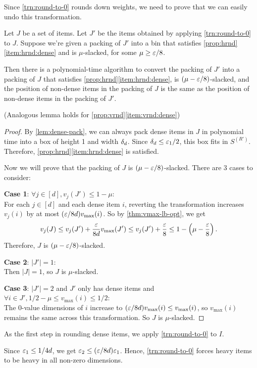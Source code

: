 Since \cref{trn:round-to-0} rounds down weights,
we need to prove that we can easily undo this transformation.
\begin{lemma}
\label{lem:round-to-0}
Let $J$ be a set of items.
Let $J'$ be the items obtained by applying \cref{trn:round-to-0} to $J$.
Suppose we're given a packing of $J'$ into a bin that satisfies
\cref{prop:hrnd}\ref{item:hrnd:dense} and is $\mu$-slacked, for some $\mu \ge \varepsilon/8$.

Then there is a polynomial-time algorithm to convert the packing of $J'$
into a packing of $J$ that satisfies \cref{prop:hrnd}\ref{item:hrnd:dense},
is $(\mu - \varepsilon/8)$-slacked, and the position of non-dense items in the packing of $J$
is the same as the position of non-dense items in the packing of $J'$.
\end{lemma}
(Analogous lemma holds for \cref{prop:vrnd}\ref{item:vrnd:dense})
\begin{proof}
By \cref{lem:dense-pack}, we can always pack dense items in $J$ in polynomial time
into a box of height 1 and width $\delta_d$.
Since $\delta_d \le \varepsilon_1/2$, this box fits in $S^{(R')}$.
Therefore, \cref{prop:hrnd}\ref{item:hrnd:dense} is satisfied.

Now we will prove that the packing of $J$ is $(\mu - \varepsilon/8)$-slacked.
There are 3 cases to consider:

\textbf{Case 1}: $\forall j \in [d], v_j(J') \le 1-\mu$:\\
For each $j \in [d]$ and each dense item $i$,
reverting the transformation increases $v_j(i)$ by at most $(\varepsilon/8d) v_{\max}(i)$.
So by \cref{thm:vmax-lb-opt}, we get
\[ v_j(J) \le v_j(J') + \frac{\varepsilon}{8d} v_{\max}(J')
\le v_j(J') + \frac{\varepsilon}{8} \le 1 - \left(\mu - \frac{\varepsilon}{8}\right). \]
Therefore, $J$ is $(\mu - \varepsilon/8)$-slacked.

\textbf{Case 2}: $|J'| = 1$:\\
Then $|J|=1$, so $J$ is $\mu$-slacked.

\textbf{Case 3}: $|J'| = 2$ and $J'$ only has dense items
and $\forall i \in J', 1/2 - \mu \le v_{\max}(i) \le 1/2$:\\
The 0-value dimensions of $i$ increase to $(\varepsilon/8d) v_{\max}(i) \le v_{\max}(i)$,
so $v_{\max}(i)$ remains the same across this transformation. So $J$ is $\mu$-slacked.
\end{proof}

As the first step in rounding dense items, we apply \cref{trn:round-to-0} to $I$.

Since $\varepsilon_1 \le 1/4d$, we get $\varepsilon_2 \le (\varepsilon/8d)\varepsilon_1$.
Hence, \cref{trn:round-to-0} forces heavy items to be heavy in all non-zero dimensions.

